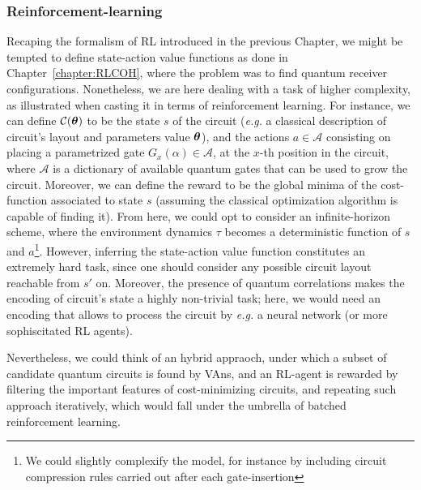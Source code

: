 \subsubsection{Reinforcement-learning}

Recaping the formalism of RL introduced in the previous Chapter, we might be tempted to define state-action value functions as done in Chapter~\ref{chapter:RLCOH}, where the problem was to find quantum receiver configurations. Nonetheless, we are here dealing with a task of higher complexity, as illustrated when casting it in terms of reinforcement learning. For instance, we can define $\mathcal{C}(\bm{\theta})$ to be the state $s$ of the circuit (\textit{e.g.} a classical description of circuit's layout and parameters value $\bm{\theta}$), and the actions $a \in \mathcal{A}$ consisting on placing a parametrized gate $G_x(\alpha) \in \mathcal{A}$, at the $x$-th position in the circuit, where $\mathcal{A}$ is a dictionary of available quantum gates that can be used to grow the circuit. Moreover, we can define the reward to be the global minima of the cost-function associated to state $s$ (assuming the classical optimization algorithm is capable of finding it). From here, we could opt to consider an infinite-horizon scheme, where the environment dynamics $\tau$
becomes a deterministic function of $s$ and $a$\footnote{We could slightly complexify the model, for instance by including circuit compression rules carried out after each gate-insertion}. However, inferring the state-action value function constitutes an extremely hard task, since one should consider any possible circuit layout reachable from $s'$ on. Moreover, the presence of quantum correlations makes the encoding of circuit's state a highly non-trivial task; here, we would need an encoding that allows to process the circuit by \textit{e.g.} a neural network (or more sophiscitated RL agents).

Nevertheless, we could think of an hybrid appraoch, under which a subset of candidate quantum circuits is found by VAns, and an RL-agent is rewarded by filtering the important features of cost-minimizing circuits, and repeating such approach iteratively, which would fall under the umbrella of batched reinforcement learning.

